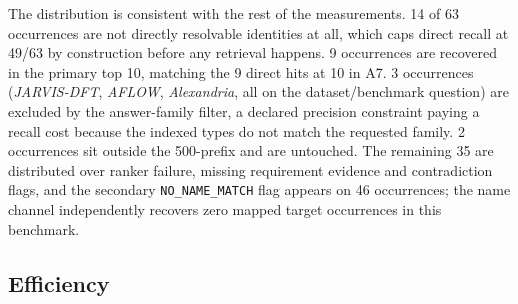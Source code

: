 \documentclass[11pt,a4paper]{article}
\begin{document}
The distribution is consistent with the rest of the measurements. 14 of 63 occurrences are not directly resolvable identities at all, which caps direct recall at 49/63 by construction before any retrieval happens. 9 occurrences are recovered in the primary top 10, matching the 9 direct hits at 10 in A7. 3 occurrences (\emph{JARVIS-DFT}, \emph{AFLOW}, \emph{Alexandria}, all on the dataset/benchmark question) are excluded by the answer-family filter, a declared precision constraint paying a recall cost because the indexed types do not match the requested family. 2 occurrences sit outside the 500-prefix and are untouched. The remaining 35 are distributed over ranker failure, missing requirement evidence and contradiction flags, and the secondary \texttt{NO\_NAME\_MATCH} flag appears on 46 occurrences; the name channel independently recovers zero mapped target occurrences in this benchmark.

\subsection{Efficiency}
\label{sec:efficiency}
\end{document}
